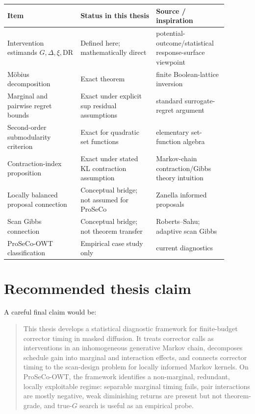 \documentclass[11pt]{article}
\newcommand{\1}{\mathbf 1}
\begin{document}
\begin{center}
\begin{tabular}{p{0.30\linewidth}p{0.31\linewidth}p{0.28\linewidth}}
\toprule
Item & Status in this thesis & Source / inspiration \\
\midrule
Intervention estimands \(G,\Delta,\xi,\mathrm{DR}\) & Defined here; mathematically direct & potential-outcome/statistical response-surface viewpoint \\
Möbius decomposition & Exact theorem & finite Boolean-lattice inversion \\
Marginal and pairwise regret bounds & Exact under explicit sup residual assumptions & standard surrogate-regret argument \\
Second-order submodularity criterion & Exact for quadratic set functions & elementary set-function algebra \\
Contraction-index proposition & Exact under stated KL contraction assumption & Markov-chain contraction/Gibbs theory intuition \\
Locally balanced proposal connection & Conceptual bridge; not assumed for ProSeCo & Zanella informed proposals \\
Scan Gibbs connection & Conceptual bridge; not theorem transfer & Roberts--Sahu; adaptive scan Gibbs \\
ProSeCo-OWT classification & Empirical case study only & current diagnostics \\
\bottomrule
\end{tabular}
\end{center}

\section{Recommended thesis claim}

A careful final claim would be:

\begin{quote}
This thesis develops a statistical diagnostic framework for finite-budget
corrector timing in masked diffusion.  It treats corrector calls as
interventions in an inhomogeneous generative Markov chain, decomposes schedule
gain into marginal and interaction effects, and connects corrector timing to
the scan-design problem for locally informed Markov kernels.  On ProSeCo-OWT,
the framework identifies a non-marginal, redundant, locally exploitable regime:
separable marginal timing fails, pair interactions are mostly negative, weak
diminishing returns are present but not theorem-grade, and true-\(G\) search is
useful as an empirical probe.
\end{quote}
\end{document}
